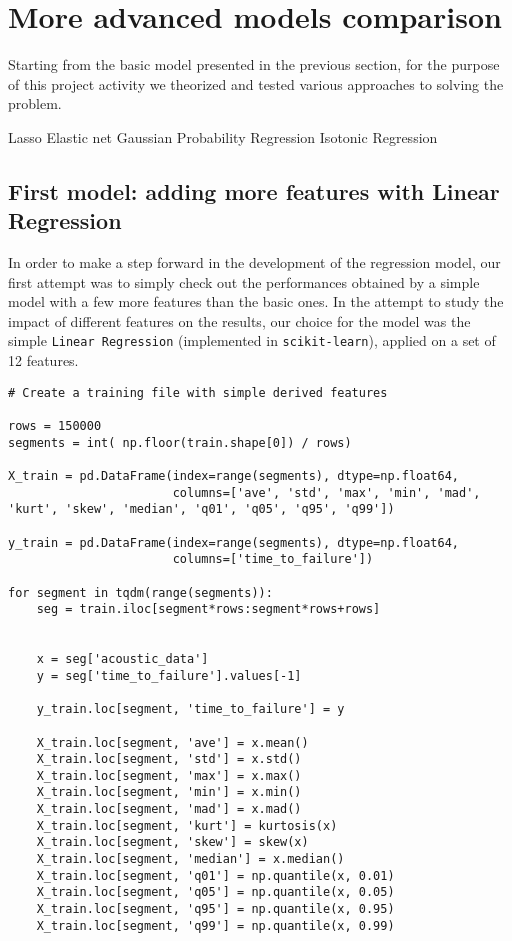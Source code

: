 \chapter{More advanced models comparison}
\label{capitolo3}
\thispagestyle{empty}

\noindent Starting from the basic model presented in the previous section, for the purpose of this project activity we theorized and tested various approaches to solving the problem.

Lasso
Elastic net
Gaussian Probability Regression
Isotonic Regression

\section[First model]{First model: adding more features with Linear Regression}
In order to make a step forward in the development of the regression model, our first attempt was to simply check out the performances obtained by a simple model with a few more features than the basic ones. In the attempt to study the impact of different features on the results, our choice for the model was the simple \texttt{Linear Regression} (implemented in \texttt{scikit-learn}), applied on a set of 12 features.

\begin{lstlisting}[firstnumber=35]
# Create a training file with simple derived features

rows = 150000 
segments = int( np.floor(train.shape[0]) / rows) 

X_train = pd.DataFrame(index=range(segments), dtype=np.float64,
                       columns=['ave', 'std', 'max', 'min', 'mad', 'kurt', 'skew', 'median', 'q01', 'q05', 'q95', 'q99'])

y_train = pd.DataFrame(index=range(segments), dtype=np.float64,
                       columns=['time_to_failure'])
 
for segment in tqdm(range(segments)):
    seg = train.iloc[segment*rows:segment*rows+rows]
    

    x = seg['acoustic_data'] 
    y = seg['time_to_failure'].values[-1]
    
    y_train.loc[segment, 'time_to_failure'] = y
    
    X_train.loc[segment, 'ave'] = x.mean()
    X_train.loc[segment, 'std'] = x.std()
    X_train.loc[segment, 'max'] = x.max()
    X_train.loc[segment, 'min'] = x.min()
    X_train.loc[segment, 'mad'] = x.mad()
    X_train.loc[segment, 'kurt'] = kurtosis(x)
    X_train.loc[segment, 'skew'] = skew(x)
    X_train.loc[segment, 'median'] = x.median()
    X_train.loc[segment, 'q01'] = np.quantile(x, 0.01)
    X_train.loc[segment, 'q05'] = np.quantile(x, 0.05)
    X_train.loc[segment, 'q95'] = np.quantile(x, 0.95)
    X_train.loc[segment, 'q99'] = np.quantile(x, 0.99)
\end{lstlisting}


